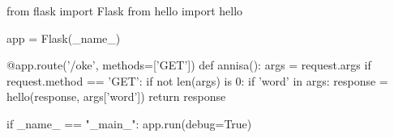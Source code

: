 from flask import Flask
from hello import hello

app = Flask(_name_)

@app.route('/oke', methods=['GET'])
def annisa():
	args = request.args
	if request.method == 'GET':
		if not len(args) is 0: 
			if 'word' in args:
				response = hello(response, args['word'])
			return response

if _name_ == "_main_":
	app.run(debug=True)
